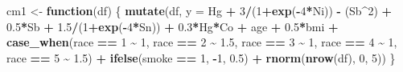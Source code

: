 \documentclass[12pt, twoside]{amherstthesis}
\newenvironment{Shaded}{\begin{snugshade}}{\end{snugshade}}
\newcommand{\AttributeTok}[1]{\textcolor[rgb]{0.13,0.29,0.53}{#1}}
\newcommand{\ControlFlowTok}[1]{\textcolor[rgb]{0.13,0.29,0.53}{\textbf{#1}}}
\newcommand{\DecValTok}[1]{\textcolor[rgb]{0.00,0.00,0.81}{#1}}
\newcommand{\FloatTok}[1]{\textcolor[rgb]{0.00,0.00,0.81}{#1}}
\newcommand{\FunctionTok}[1]{\textcolor[rgb]{0.13,0.29,0.53}{\textbf{#1}}}
\newcommand{\NormalTok}[1]{#1}
\newcommand{\OtherTok}[1]{\textcolor[rgb]{0.56,0.35,0.01}{#1}}
\newcommand{\SpecialCharTok}[1]{\textcolor[rgb]{0.81,0.36,0.00}{\textbf{#1}}}
\begin{document}
\begin{Shaded}
\begin{Highlighting}[]
\NormalTok{cm1 }\OtherTok{\textless{}{-}} \ControlFlowTok{function}\NormalTok{(df) \{}
  \FunctionTok{mutate}\NormalTok{(df, }\AttributeTok{y =} 
\NormalTok{           Hg }\SpecialCharTok{+} \DecValTok{3}\SpecialCharTok{/}\NormalTok{(}\DecValTok{1}\SpecialCharTok{+}\FunctionTok{exp}\NormalTok{(}\SpecialCharTok{{-}}\DecValTok{4}\SpecialCharTok{*}\NormalTok{Ni)) }\SpecialCharTok{{-}}\NormalTok{ (Sb}\SpecialCharTok{\^{}}\DecValTok{2}\NormalTok{) }\SpecialCharTok{+} \FloatTok{0.5}\SpecialCharTok{*}\NormalTok{Sb }\SpecialCharTok{+} \FloatTok{1.5}\SpecialCharTok{/}\NormalTok{(}\DecValTok{1}\SpecialCharTok{+}\FunctionTok{exp}\NormalTok{(}\SpecialCharTok{{-}}\DecValTok{4}\SpecialCharTok{*}\NormalTok{Sn)) }\SpecialCharTok{+} 
           \FloatTok{0.3}\SpecialCharTok{*}\NormalTok{Hg}\SpecialCharTok{*}\NormalTok{Co }\SpecialCharTok{+} 
\NormalTok{           age }\SpecialCharTok{+} \FloatTok{0.5}\SpecialCharTok{*}\NormalTok{bmi }\SpecialCharTok{+} 
           \FunctionTok{case\_when}\NormalTok{(race }\SpecialCharTok{==} \DecValTok{1} \SpecialCharTok{\textasciitilde{}} \DecValTok{1}\NormalTok{, }
\NormalTok{                     race }\SpecialCharTok{==} \DecValTok{2} \SpecialCharTok{\textasciitilde{}} \FloatTok{1.5}\NormalTok{, }
\NormalTok{                     race }\SpecialCharTok{==} \DecValTok{3} \SpecialCharTok{\textasciitilde{}} \DecValTok{1}\NormalTok{, }
\NormalTok{                     race }\SpecialCharTok{==} \DecValTok{4} \SpecialCharTok{\textasciitilde{}} \DecValTok{1}\NormalTok{, }
\NormalTok{                     race }\SpecialCharTok{==} \DecValTok{5} \SpecialCharTok{\textasciitilde{}} \FloatTok{1.5}\NormalTok{) }\SpecialCharTok{+}
           \FunctionTok{ifelse}\NormalTok{(smoke }\SpecialCharTok{==} \DecValTok{1}\NormalTok{, }\SpecialCharTok{{-}}\DecValTok{1}\NormalTok{, }\FloatTok{0.5}\NormalTok{) }\SpecialCharTok{+}
           \FunctionTok{rnorm}\NormalTok{(}\FunctionTok{nrow}\NormalTok{(df), }\DecValTok{0}\NormalTok{, }\DecValTok{5}\NormalTok{))}
\NormalTok{\}}


\end{Highlighting}
\end{Shaded}
\end{document}
